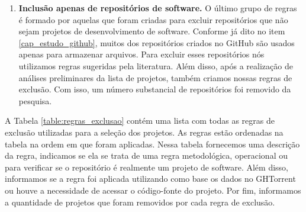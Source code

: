 \begin{enumerate}
\item \textbf{Inclusão apenas de repositórios de software. } O último grupo de regras é formado por aquelas que foram criadas para excluir repositórios que não sejam projetos de desenvolvimento de software. Conforme já dito no item \ref{cap_estudo_github}, muitos dos repositórios criados no GitHub são usados apenas para armazenar arquivos. Para excluir esses repositórios nós utilizamos regras sugeridas pela literatura. Além disso, após a realização de análises preliminares da lista de projetos, também criamos nossas regras de exclusão. Com isso, um número substancial de repositórios foi removido da pesquisa. 
\end{enumerate}

A Tabela \ref{table:regras_exclusao} contém uma lista com todas as regras de exclusão utilizadas para a seleção dos projetos. As regras estão ordenadas na tabela na ordem em que foram aplicadas. Nessa tabela fornecemos uma descrição da regra, indicamos se ela se trata de uma regra metodológica, operacional ou para verificar se o repositório é realmente um projeto de software. Além disso, informamos se a regra foi aplicada utilizando como base os dados no GHTorrent ou houve a necessidade de acessar o código-fonte do projeto.  Por fim, informamos a quantidade de projetos que foram removidos por cada regra de exclusão. 



